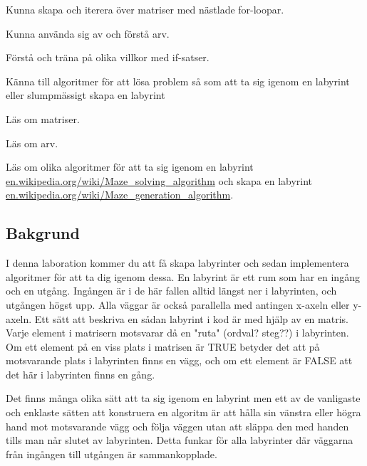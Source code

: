 

\Lab{\LabWeekNINE}

\begin{Goals}
\item Kunna skapa och iterera över matriser med nästlade for-loopar.
\item Kunna använda sig av och förstå arv.
\item Förstå och träna på olika villkor med if-satser.
\item Känna till algoritmer för att lösa problem så som att ta sig igenom en labyrint eller slumpmässigt skapa en labyrint
\end{Goals}

\begin{Preparations}
\item Läs om matriser.
\item Läs om arv.
\item Läs om olika algoritmer för att ta sig igenom en labyrint \href{https://en.wikipedia.org/wiki/Maze_solving_algorithm}{en.wikipedia.org/wiki/Maze\_solving\_algorithm} 
och skapa en labyrint 
\href{https://en.wikipedia.org/wiki/Maze_generation_algorithm}{en.wikipedia.org/wiki/Maze\_generation\_algorithm}.
\end{Preparations}

\subsection{Bakgrund}
I denna laboration kommer du att få skapa labyrinter och sedan implementera algoritmer för att ta dig igenom dessa. En labyrint är ett rum som har en ingång och en utgång. Ingången är i de här fallen alltid längst ner i labyrinten, och utgången högst upp. Alla väggar är också parallella med antingen x-axeln eller y-axeln. Ett sätt att beskriva en sådan labyrint i kod är med hjälp av en matris. Varje element i matrisern motsvarar då en "ruta" (ordval? steg??) i labyrinten. Om ett element på en viss plats i matrisen är TRUE betyder det att på motsvarande plats i labyrinten finns en vägg, och om ett element är FALSE att det här i labyrinten finns en gång.

Det finns många olika sätt att ta sig igenom en labyrint men ett av de vanligaste och enklaste sätten att konstruera en algoritm är att hålla sin vänstra eller högra hand mot motsvarande vägg och följa väggen utan att släppa den med handen tills man når slutet av labyrinten. Detta funkar för alla labyrinter där väggarna från ingången till utgången är sammankopplade.

